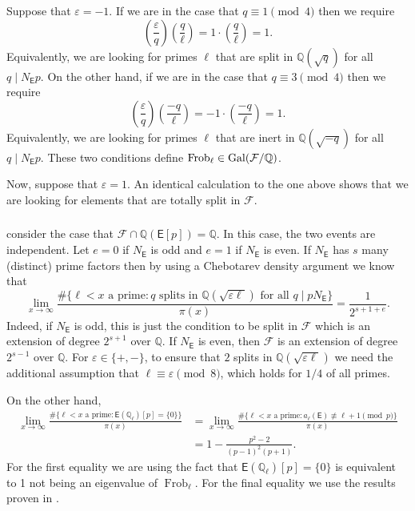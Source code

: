 \documentclass{amsart}
\newcommand{\DK}[1]{\textcolor{purple}{#1}}
\newcommand{\KM}[1]{\textcolor{OliveGreen}{#1}}
\numberwithin{equation}{section}
\theoremstyle{remark}
\newcommand{\Gal}{\operatorname{Gal}}
\newcommand{\Frob}{\operatorname{Frob}}
\newcommand{\Q}{\mathbb{Q}}
\newcommand{\EC}{\mathsf{E}}
\theoremstyle{plain} %
\begin{document}
Suppose that $\varepsilon=-1$.
If we are in the case that $q\equiv 1 \pmod{4}$ then we require
\[
\left(\frac{\varepsilon}{q}\right)\left(\frac{q}{\ell}\right) = 1 \cdot \left(\frac{q}{\ell}\right) =1.
\]
Equivalently, we are looking for primes $\ell$ that are split in $\Q(\sqrt{q})$ for all $q\mid N_{\EC}p$. %
On the other hand, if we are in the case that $q\equiv 3 \pmod{4}$ then we require
\[
\left(\frac{\varepsilon}{q}\right)\left(\frac{-q}{\ell}\right) = -1 \cdot \left(\frac{-q}{\ell}\right) =1.
\]
Equivalently, we are looking for primes $\ell$ that are inert in $\Q(\sqrt{-q})$ for all $q\mid N_{\EC}p$.
These two conditions define $\textup{Frob}_{\ell}\in \Gal(\mathcal{F}/\Q)$.

Now, suppose that $\varepsilon=1$.
An identical calculation to the one above shows that we are looking for elements that are totally split in $\mathcal{F}$.

\subsubsection{}
consider the case that $\mathcal{F}\cap \Q(\EC[p]) = \Q$.
In this case, the two events are independent.
Let $e=0$ if $N_{\EC}$ is odd and $e=1$ if $N_{\EC}$ is even.
If $N_{\EC}$ has $s$ many (distinct) prime factors then by using a Chebotarev density argument we know that
\[
\lim_{x\rightarrow\infty} \frac{\# \{\ell < x \text{ a prime} \colon q \text{ splits in } \Q(\sqrt{\varepsilon\ell})\text{ for all }q\mid pN_{\EC} \}}{\pi(x)} = \frac{1}{2^{s+1+e}}.
\]
Indeed, if $N_{\EC}$ is odd, this is just the condition to be split in $\mathcal{F}$ which is an extension of degree $2^{s+1}$ over $\Q$.
If $N_{\EC}$ is even, then $\mathcal{F}$ is an extension of degree $2^{s-1}$ over $\Q$.
For $\varepsilon\in \{+,-\}$, to ensure that $2$ splits in $\Q(\sqrt{\varepsilon\ell})$ we need the additional assumption that $\ell\equiv \varepsilon \pmod{8}$, which holds for $1/4$ of all primes.

On the other hand,
\begin{align*}
\lim_{x\rightarrow\infty} \frac{\# \{\ell < x \text{ a prime} \colon \EC(\Q_{\ell})[p] = \{0\}\}}{\pi(x)}
&= \lim_{x\rightarrow\infty} \frac{\# \{\ell < x \text{ a prime} \colon a_{\ell}(\EC) \not\equiv \ell+1\pmod{p}\}}{\pi(x)} \\
& = 1 - \frac{p^2 -2}{(p-1)^2(p+1)}.
\end{align*}
For the first equality we are using the fact that $\EC(\Q_{\ell})[p] = \{0\}$ is equivalent to 1 not being an eigenvalue of $\Frob_{\ell}$.
For the final equality we use the results proven in \cite[Section~3.2]{HK23}.
\end{document}
